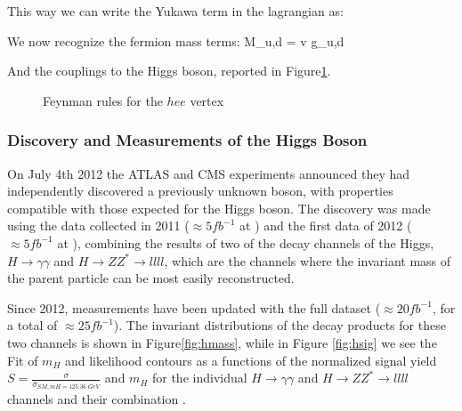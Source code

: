 This way we can write the Yukawa term in the lagrangian as:

We now recognize the fermion mass terms:
\beq
M_{u,d} =   v g_{u,d}
\eeq

And the couplings to the Higgs boson, reported in Figure\ref{fig:hee}.

\begin{figure}
\begin{center}
\end{center}
\caption[Feynman rules for the $hee$ vertex]{Feynman rules for the $hee$ vertex}
\label{fig:hee}
\end{figure}


\subsubsection{Discovery and Measurements of the Higgs Boson}

On July 4th 2012 the ATLAS and CMS experiments announced they had independently discovered a previously unknown boson, with properties compatible with those expected for the Higgs boson. The discovery was made using the data collected in 2011 ($\approx 5 fb^{-1}$ at \cmsette) and the first data of 2012 ($\approx 5 fb^{-1}$ at \cmotto), combining the results of two of the decay channels of the Higgs, $H \rightarrow \gamma \gamma $ and $H \rightarrow Z Z^* \rightarrow llll $, which are the channels where the invariant mass of the parent particle can be most easily reconstructed. 

Since 2012, measurements have been updated with the full \cmotto dataset ($\approx 20 fb^{-1}$, for a total of $\approx 25 fb^{-1}$). The invariant distributions of the decay products for these two channels is shown in Figure\ref{fig:hmass}, while in Figure \ref{fig:hsig} we see the Fit of $m_H$ and likelihood contours as a functions of the normalized signal yield $S= \frac{\sigma}{\sigma_{SM,mH = 125.36 \; GeV}}$ and $m_H$ for the individual $H \rightarrow \gamma \gamma $ and $H \rightarrow Z Z^* \rightarrow llll $ channels and their combination \cite{atlas:hmass}.

